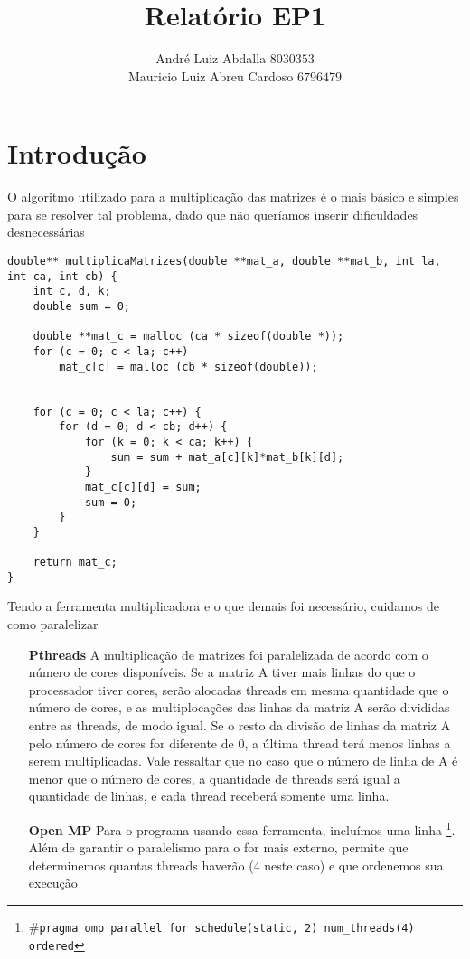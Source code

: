 \documentclass[11pt]{article}
\author{André Luiz Abdalla $8030353$ \\ Mauricio Luiz Abreu Cardoso $6796479$}
\title{Relatório EP1}
\begin{document}
    \maketitle

    \section{Introdução}

    O algoritmo utilizado para a multiplicação das matrizes é o mais básico e simples para se resolver tal problema,
    dado que não queríamos inserir dificuldades desnecessárias

    \begin{lstlisting}[caption=Função para multiplicar matrizes]
double** multiplicaMatrizes(double **mat_a, double **mat_b, int la, int ca, int cb) {
    int c, d, k;
    double sum = 0;

    double **mat_c = malloc (ca * sizeof(double *));
    for (c = 0; c < la; c++)
        mat_c[c] = malloc (cb * sizeof(double));


    for (c = 0; c < la; c++) {
        for (d = 0; d < cb; d++) {
            for (k = 0; k < ca; k++) {
                sum = sum + mat_a[c][k]*mat_b[k][d];
            }
            mat_c[c][d] = sum;
            sum = 0;
        }
    }

    return mat_c;
}
    \end{lstlisting}

    Tendo a ferramenta multiplicadora e o que demais foi necessário, cuidamos de como paralelizar \begin{itemize}
        \item[\textbf{Pthreads}] A multiplicação de matrizes foi paralelizada de acordo com o número de cores disponíveis. Se a matriz A tiver mais linhas do que o processador tiver cores, serão alocadas threads em mesma quantidade que o número de cores, e as multiplocações das linhas da matriz A serão divididas entre as threads, de modo igual. Se o resto da divisão de linhas da matriz A pelo número de cores for diferente de 0, a última thread terá menos linhas a serem multiplicadas. Vale ressaltar que no caso que o número de linha de A é menor que o número de cores, a quantidade de threads será igual a quantidade de linhas, e cada thread receberá somente uma linha.
        \item[\textbf{Open MP}] Para o programa usando essa ferramenta, incluímos uma linha
        \footnote{\texttt{$\#$pragma omp parallel for schedule(static, 2) num\_threads(4) ordered}}. Além de garantir o
        paralelismo para o for mais externo, permite que determinemos quantas threads haverão (4 neste caso) e que ordenemos sua execução
    \end{itemize}
\end{document}
